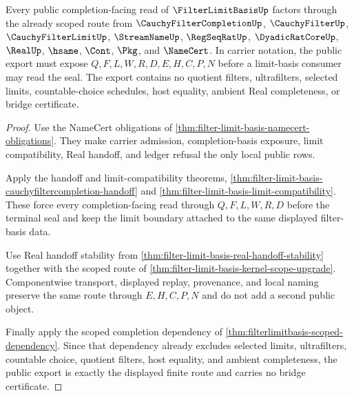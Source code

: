 \begin{theorem}
\label{thm:filter-limit-basis-public-export}
Every public completion-facing read of $\FilterLimitBasisUp$ factors through the already scoped route from $\CauchyFilterCompletionUp$, $\CauchyFilterUp$, $\CauchyFilterLimitUp$, $\StreamNameUp$, $\RegSeqRatUp$, $\DyadicRatCoreUp$, $\RealUp$, $\hsame$, $\Cont$, $\Pkg$, and $\NameCert$. In carrier notation, the public export must expose $Q,F,L,W,R,D,E,H,C,P,N$ before a limit-basis consumer may read the seal. The export contains no quotient filters, ultrafilters, selected limits, countable-choice schedules, host equality, ambient Real completeness, or bridge certificate.
\end{theorem}
\begin{proof}
Use the NameCert obligations of \autoref{thm:filter-limit-basis-namecert-obligations}. They make carrier admission, completion-basis exposure, limit compatibility, Real handoff, and ledger refusal the only local public rows.

Apply the handoff and limit-compatibility theorems, \autoref{thm:filter-limit-basis-cauchyfiltercompletion-handoff} and \autoref{thm:filter-limit-basis-limit-compatibility}. These force every completion-facing read through $Q,F,L,W,R,D$ before the terminal seal and keep the limit boundary attached to the same displayed filter-basis data.

Use Real handoff stability from \autoref{thm:filter-limit-basis-real-handoff-stability} together with the scoped route of \autoref{thm:filter-limit-basis-kernel-scope-upgrade}. Componentwise transport, displayed replay, provenance, and local naming preserve the same route through $E,H,C,P,N$ and do not add a second public object.

Finally apply the scoped completion dependency of \autoref{thm:filterlimitbasis-scoped-dependency}. Since that dependency already excludes selected limits, ultrafilters, countable choice, quotient filters, host equality, and ambient completeness, the public export is exactly the displayed finite route and carries no bridge certificate.
\end{proof}


